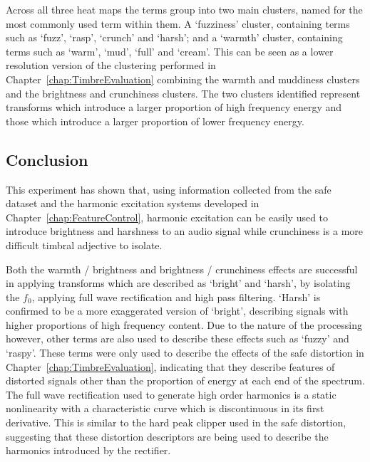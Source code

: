 			Across all three heat maps the terms group into two main clusters, named for the most commonly used
			term within them. A `fuzziness' cluster, containing terms such as `fuzz', `rasp', `crunch' and
			`harsh'; and a `warmth' cluster, containing terms such as `warm', `mud', `full' and `cream'. This
			can be seen as a lower resolution version of the clustering performed in
			Chapter~\ref{chap:TimbreEvaluation} combining the warmth and muddiness clusters and the brightness
			and crunchiness clusters. The two clusters identified represent transforms which introduce a larger
			proportion of high frequency energy and those which introduce a larger proportion of lower
			frequency energy.

	\subsection{Conclusion}
	\label{sec:PerceptualExperiments-SemanticControl-Conclusion}
		This experiment has shown that, using information collected from the \acrshort{safe} dataset and the
		harmonic excitation systems developed in Chapter~\ref{chap:FeatureControl}, harmonic excitation can be
		easily used to introduce brightness and harshness to an audio signal while crunchiness is a more difficult
		timbral adjective to isolate.

		Both the warmth / brightness and brightness / crunchiness effects are successful in applying transforms
		which are described as `bright' and `harsh', by isolating the $f_{0}$, applying full wave rectification and
		high pass filtering. `Harsh' is confirmed to be a more exaggerated version of `bright', describing signals
		with higher proportions of high frequency content. Due to the nature of the processing however, other terms
		are also used to describe these effects such as `fuzzy' and `raspy'. These terms were only used to describe
		the effects of the \acrshort{safe} distortion in Chapter~\ref{chap:TimbreEvaluation}, indicating that they
		describe features of distorted signals other than the proportion of energy at each end of the spectrum. The
		full wave rectification used to generate high order harmonics is a static nonlinearity with a
		characteristic curve which is discontinuous in its first derivative. This is similar to the hard peak
		clipper used in the \acrshort{safe} distortion, suggesting that these distortion descriptors are being used
		to describe the harmonics introduced by the rectifier.

